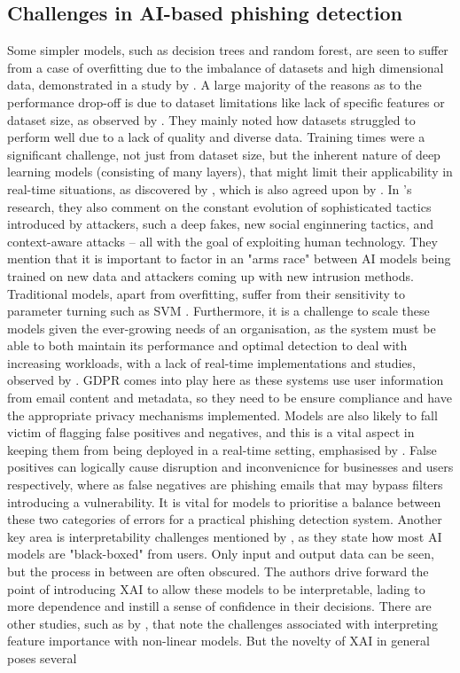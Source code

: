 \subsection*{Challenges in AI-based phishing detection}

Some simpler models, such as decision trees and random forest, are seen to suffer from a case of overfitting due to the imbalance of datasets and high dimensional data, demonstrated in a study by \cite{harikrishnan2018machine}. A large majority of the reasons as to the performance drop-off is due to dataset limitations like lack of specific features or dataset size, as observed by \cite{ahmad2024across}. They mainly noted how datasets struggled to perform well due to a lack of quality and diverse data. Training times were a significant challenge, not just from dataset size, but the inherent nature of deep learning models (consisting of many layers), that might limit their applicability in real-time situations, as discovered by \cite{kapoor2024comparative}, which is also agreed upon by \cite{atlam2022business}. In \cite{kapoor2024comparative}'s research, they also comment on the constant evolution of sophisticated tactics introduced by attackers, such a deep fakes, new social enginnering tactics, and context-aware attacks -- all with the goal of exploiting human technology. They mention that it is important to factor in an "arms race" between AI models being trained on new data and attackers coming up with new intrusion methods. Traditional models, apart from overfitting, suffer from their sensitivity to parameter turning such as SVM \citep{andriu2023adaptive}. Furthermore, it is a challenge to scale these models given the ever-growing needs of an organisation, as the system must be able to both maintain its performance and optimal detection to deal with increasing workloads, with a lack of real-time implementations and studies, observed by \cite{atlam2022business}. GDPR comes into play here as these systems use user information from email content and metadata, so they need to be ensure compliance and have the appropriate privacy mechanisms implemented. Models are also likely to fall victim of flagging false positives and negatives, and this is a vital aspect in keeping them from being deployed in a real-time setting, emphasised by \cite{vishwanath2011people}. False positives can logically cause disruption and inconvenicnce for businesses and users respectively, where as false negatives are phishing emails that may bypass filters introducing a vulnerability. It is vital for models to prioritise a balance between these two categories of errors for a practical phishing detection system. Another key area is interpretability challenges mentioned by \cite{atlam2022business}, as they state how most AI models are "black-boxed" from users. Only input and output data can be seen, but the process in between are often obscured. The authors drive forward the point of introducing XAI to allow these models to be interpretable, lading to more dependence and instill a sense of confidence in their decisions. There are other studies, such as by \cite{al2024novel}, that note the challenges associated with interpreting feature importance with non-linear models. But the novelty of XAI in general poses several 